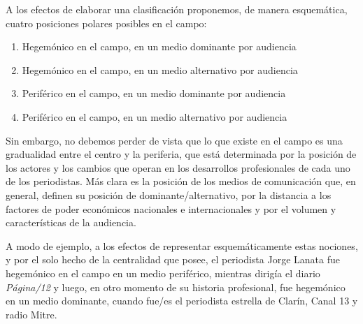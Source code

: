 A los efectos de elaborar una clasificación proponemos, de manera esquemática, cuatro posiciones polares posibles en el campo:

\begin{enumerate}
\def\labelenumi{\arabic{enumi})}
\item
  Hegemónico en el campo, en un medio dominante por audiencia
\item
  Hegemónico en el campo, en un medio alternativo por audiencia
\item
  Periférico en el campo, en un medio dominante por audiencia
\item
  Periférico en el campo, en un medio alternativo por audiencia
\end{enumerate}

Sin embargo, no debemos perder de vista que lo que existe en el campo es una gradualidad entre el centro y la periferia, que está determinada por la posición de los actores y los cambios que operan en los desarrollos profesionales de cada uno de los periodistas. Más clara es la posición de los medios de comunicación que, en general, definen su posición de dominante/alternativo, por la distancia a los factores de poder económicos nacionales e internacionales y por el volumen y características de la audiencia.

A modo de ejemplo, a los efectos de representar esquemáticamente estas nociones, y por el solo hecho de la centralidad que posee, el periodista Jorge Lanata fue hegemónico en el campo en un medio periférico, mientras dirigía el diario \emph{Página/12} y luego, en otro momento de su historia profesional, fue hegemónico en un medio dominante, cuando fue/es el periodista estrella de Clarín, Canal 13 y radio Mitre.

